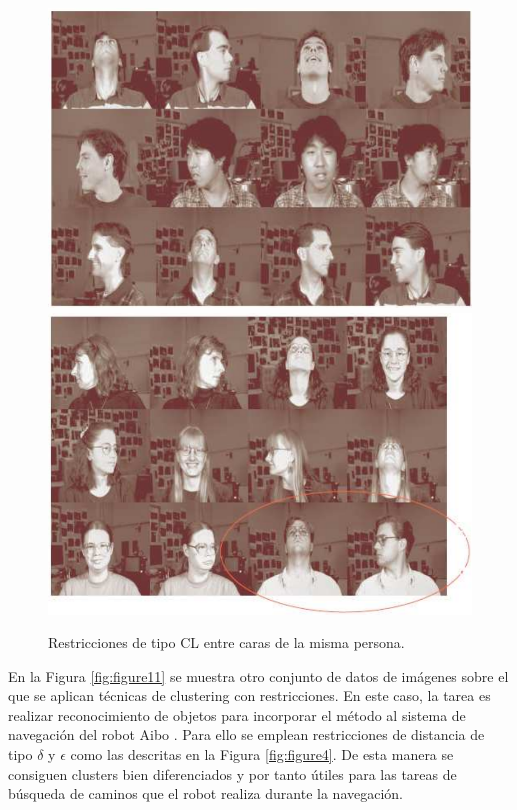 \begin{figure}[bth]
	\myfloatalign
	{\includegraphics[width=.35\linewidth]{imagenes/c3/AnalisisImagenes/CarasDifOr1}} \quad
	{\includegraphics[width=.35\linewidth]{imagenes/c3/AnalisisImagenes/CarasDifOr2}}
	\caption[Restricciones de tipo \ac{CL} entre caras de la misma persona.]{Restricciones de tipo \ac{CL} entre caras de la misma persona.  \cite{Survey:2007}}\label{fig:figure10}
\end{figure}

En la Figura \ref{fig:figure11} se muestra otro conjunto de datos de imágenes sobre el que se aplican técnicas de clustering con restricciones. En este caso, la tarea es realizar reconocimiento de objetos para incorporar el método al sistema de navegación del robot Aibo \cite{DavidsonRavi:2005a}. Para ello se emplean restricciones de distancia de tipo $\delta$ y $\epsilon$ como las descritas en la Figura \ref{fig:figure4}. De esta manera se consiguen clusters bien diferenciados y por tanto útiles para las tareas de búsqueda de caminos que el robot realiza durante la navegación.

